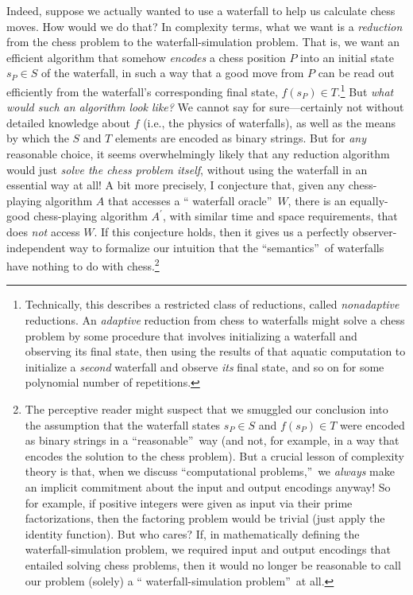 \documentclass[12pt,onecolumn]{article}%
\begin{document}
Indeed, suppose we actually wanted to use a waterfall to help us calculate
chess moves. How would we do that? In complexity terms, what we want is a
\textit{reduction} from the chess problem to the waterfall-simulation problem.
 That is, we want an efficient algorithm that somehow \textit{encodes} a
chess position $P$ into an initial state $s_{P}\in S$ of the waterfall, in
such a way that a good move from $P$ can be read out efficiently from the
waterfall's corresponding final state, $f\left(  s_{P}\right)  \in
T$.\footnote{Technically, this describes a restricted class of reductions,
called \textit{nonadaptive} reductions. An \textit{adaptive} reduction from
chess to waterfalls might solve a chess problem by some procedure that
involves initializing a waterfall and observing its final state, then using
the results of that aquatic computation to initialize a \textit{second}
waterfall and observe \textit{its} final state, and so on for some polynomial
number of repetitions.} But \textit{what would such an algorithm look like?}
 We cannot say for sure---certainly not without detailed knowledge about
$f$ (i.e., the physics of waterfalls), as well as the means by which the $S$
and $T$ elements are encoded as binary strings. But for \textit{any}
reasonable choice, it seems overwhelmingly likely that any reduction algorithm
would just \textit{solve the chess problem itself}, without using the
waterfall in an essential way at all! A bit more precisely, I conjecture
that, given any chess-playing algorithm $A$ that accesses a \textquotedblleft
waterfall oracle\textquotedblright\  $W$, there is an equally-good
chess-playing algorithm $A^{\prime}$, with similar time and space
requirements, that does \textit{not} access $W$. If this conjecture holds,
then it gives us a perfectly observer-independent way to formalize our
intuition that the \textquotedblleft semantics\textquotedblright\  of
waterfalls have nothing to do with chess.\footnote{The perceptive reader might
suspect that we smuggled our conclusion into the assumption that the waterfall
states $s_{P}\in S$ and $f\left(  s_{P}\right)  \in T$ were encoded as
binary strings in a \textquotedblleft reasonable\textquotedblright\  way (and
not, for example, in a way that encodes the solution to the chess problem).
 But a crucial lesson of complexity theory is that, when we discuss
\textquotedblleft computational problems,\textquotedblright\  we
\textit{always} make an implicit commitment about the input and output
encodings anyway! So for example, if positive integers were given as input
via their prime factorizations, then the factoring problem would be trivial
(just apply the identity function). But who cares? If, in mathematically
defining the waterfall-simulation problem, we required input and output
encodings that entailed solving chess problems, then it would no longer be
reasonable to call our problem (solely) a \textquotedblleft
waterfall-simulation problem\textquotedblright\  at all.}
\end{document}
